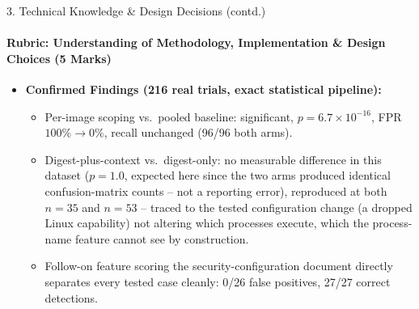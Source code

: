 \documentclass[aspectratio=169, 11pt]{beamer}
\begin{document}
\begin{frame}{3. Technical Knowledge \& Design Decisions (contd.)}
    \framesubtitle{Rubric: Understanding of Methodology, Implementation \& Design Choices (5 Marks)}
    \footnotesize
    \begin{itemize}
        \item \textbf{Confirmed Findings (216 real trials, exact statistical pipeline):}
        \begin{itemize}
            \item Per-image scoping vs.\ pooled baseline: significant, $p=6.7\times10^{-16}$, FPR $100\%\to0\%$, recall unchanged (96/96 both arms).
            \item Digest-plus-context vs.\ digest-only: no measurable difference in this dataset ($p=1.0$, expected here since the two arms produced identical confusion-matrix counts -- not a reporting error), reproduced at both $n=35$ and $n=53$ -- traced to the tested configuration change (a dropped Linux capability) not altering which processes execute, which the process-name feature cannot see by construction.
            \item Follow-on feature scoring the security-configuration document directly separates every tested case cleanly: 0/26 false positives, 27/27 correct detections.
        \end{itemize}
    \end{itemize}
\end{frame}
\end{document}
